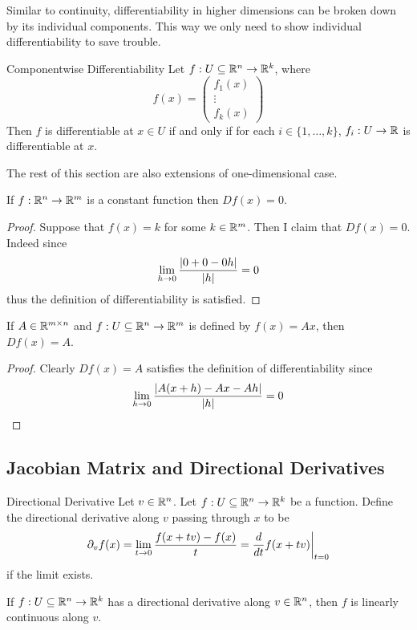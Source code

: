 \documentclass[a4paper]{article}
\begin{document}
Similar to continuity, differentiability in higher dimensions can be broken down by its individual components. This way we only need to show individual differentiability to save trouble. 

\begin{prp}{Componentwise Differentiability}{} Let $f:U\subseteq\mathbb{R}^n\to\mathbb{R}^k$, where $$f(x)=\begin{pmatrix}f_1(x)\\\vdots\\f_k(x)\end{pmatrix}$$ Then $f$ is differentiable at $x\in U$ if and only if for each $i\in\{1,\dots,k\}$, $f_i:U\to\mathbb{R}$ is differentiable at $x$. 
\end{prp}

The rest of this section are also extensions of one-dimensional case. 

\begin{prp}{}{} If $f:\mathbb{R}^n\to\mathbb{R}^m$ is a constant function then $Df(x)=0$. 
\begin{proof}
Suppose that $f(x)=k$ for some $k\in\mathbb{R}^m$. Then I claim that $Df(x)=0$. Indeed since $$\lim_{h\to 0}\frac{\abs{0+0-0h}}{\abs{h}}=0$$ thus the definition of differentiability is satisfied. 
\end{proof}
\end{prp}

\begin{prp}{}{} If $A\in\mathbb{R}^{m\times n}$ and $f:U\subseteq\mathbb{R}^n\to\mathbb{R}^m$ is defined by $f(x)=Ax$, then $Df(x)=A$. 
\begin{proof}
Clearly $Df(x)=A$ satisfies the definition of differentiability since $$\lim_{h\to 0}\frac{\abs{A(x+h)-Ax-Ah}}{\abs{h}}=0$$
\end{proof}
\end{prp}

\subsection{Jacobian Matrix and Directional Derivatives}
\begin{defn}{Directional Derivative}{} Let $v\in\mathbb{R}^n$. Let $f:U\subseteq\mathbb{R}^n\to\mathbb{R}^k$ be a function. Define the directional derivative along $v$ passing through $x$ to be $$\partial_vf(x)=\lim_{t\to 0}\frac{f(x+tv)-f(x)}{t}=\frac{d}{dt}f(x+tv)\bigg{|}_{t=0}$$ if the limit exists. 
\end{defn}

\begin{prp} If $f:U\subseteq\mathbb{R}^n\to\mathbb{R}^k$ has a directional derivative along $v\in\mathbb{R}^n$, then $f$ is linearly continuous along $v$. 
\end{prp}
\end{document}
